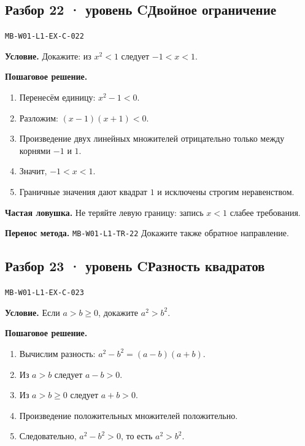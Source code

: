 \documentclass[11pt,a4paper,openany]{book}
\newcommand{\mtag}[1]{\textsf{\small\color{mbaccent}\bfseries #1}}
\newcommand{\muid}[1]{\texttt{\footnotesize #1}}
\begin{document}
\subsection*{\mtag{Разбор 22 · уровень C}\quad Двойное ограничение}\hypertarget{MB-W01-L1-EX-C-022}{}

\muid{MB-W01-L1-EX-C-022}\par

\begin{keybox}\textbf{Условие.} Докажите: из $x^2<1$ следует $-1<x<1$.\end{keybox}

\textbf{Пошаговое решение.}\par
\begin{enumerate}[label=\arabic*),leftmargin=*,itemsep=3pt,topsep=4pt]
\item Перенесём единицу: $x^2-1<0$.
\item Разложим: $(x-1)(x+1)<0$.
\item Произведение двух линейных множителей отрицательно только между корнями $-1$ и $1$.
\item Значит, $-1<x<1$.
\item Граничные значения дают квадрат $1$ и исключены строгим неравенством.
\end{enumerate}


\begin{learnbox}\textbf{Частая ловушка.} Не теряйте левую границу: запись $x<1$ слабее требования.\par \textbf{Перенос метода.} \muid{MB-W01-L1-TR-22} Докажите также обратное направление.\end{learnbox}

\subsection*{\mtag{Разбор 23 · уровень C}\quad Разность квадратов}\hypertarget{MB-W01-L1-EX-C-023}{}

\muid{MB-W01-L1-EX-C-023}\par

\begin{keybox}\textbf{Условие.} Если $a>b\ge0$, докажите $a^2>b^2$.\end{keybox}

\textbf{Пошаговое решение.}\par
\begin{enumerate}[label=\arabic*),leftmargin=*,itemsep=3pt,topsep=4pt]
\item Вычислим разность: $a^2-b^2=(a-b)(a+b)$.
\item Из $a>b$ следует $a-b>0$.
\item Из $a>b\ge0$ следует $a+b>0$.
\item Произведение положительных множителей положительно.
\item Следовательно, $a^2-b^2>0$, то есть $a^2>b^2$.
\end{enumerate}
\end{document}
